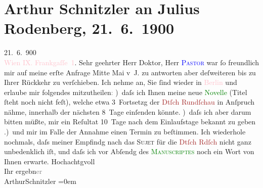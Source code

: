 

               \section[Arthur Schnitzler an Julius Rodenberg, 21. 6. 1900]{ Arthur Schnitzler an Julius Rodenberg, 21. 6. 1900}\nopagebreak{}\rehead{ }\normalsize\beginnumbering{} \toendnotes[C]{\smallbreak\pagebreak[2]} 
\toendnotes[C]{\smallbreak}\pstart
           \raggedleft{}{\pb}21. 6. 900{\\}\textcolor{pink}{Wien IX. Frankgaſſe 1}{}\ledrightnote{\textcolor{pink}{Frankgasse}}.\pend
           \pstart{}Sehr geehrter Herr Doktor,\pend\pstart
           Herr \textcolor{blue}{\textsc{Pastor}}{}\ledrightnote{\textcolor{blue}{Willy Pastor}} war ſo freundlich mir auf meine erſte Anfrage Mitte Mai v J.
                    zu antworten aber deſweiteren bis zu Ihrer Rückkehr zu verſchieben. Ich nehme
                    an, Sie ſind wieder in \textcolor{pink}{Berlin}{}\ledrightnote{\textcolor{pink}{Berlin}} und erlaube mir
                    folgendes mitzutheilen\textcolor{gray}{:}\pend
           ) daſs ich Ihnen meine neue \textcolor{green}{Novelle}{} (Titel ſteht noch nicht {\pb}feſt), welche etwa 3 Fortsetzg der \textcolor{brown}{Dtſch
                        Rundſchau}{}\ledrightnote{\textcolor{brown}{Deutsche Rundschau}} in Anſpruch nähme, innerhalb der nächsten 8 Tage einſenden
                    könnte.\pend
           ) daſs ich aber darum bitten müßte, mir ein Reſultat  10 Tage nach dem Einlaufstage bekannt zu
                    geben\pend
           .) und mir im Falle der Annahme einen Termin zu {\pb}beſtimmen.\pend
           \pstart
           Ich wiederhole nochmals, daſs meiner Empfindg nach das \textsc{Sujet} für die \textcolor{brown}{Dtſch Rdſch}{}\ledrightnote{\textcolor{brown}{Deutsche Rundschau}} nicht ganz
                    unbedenklich iſt, und daſs ich vor Abſendg des \textcolor{green}{\textsc{Manuscriptes}}{} noch ein Wort von Ihnen erwarte.\pend
           \pstart
           Hochachtgvoll{\\[\baselineskip]} Ihr ergebn\textcolor{gray}{er}{\\[\baselineskip]}\spacefill\mbox{ArthurSchnitzler}\pend
           \leftskip=0em{}\endnumbering{}  
      
